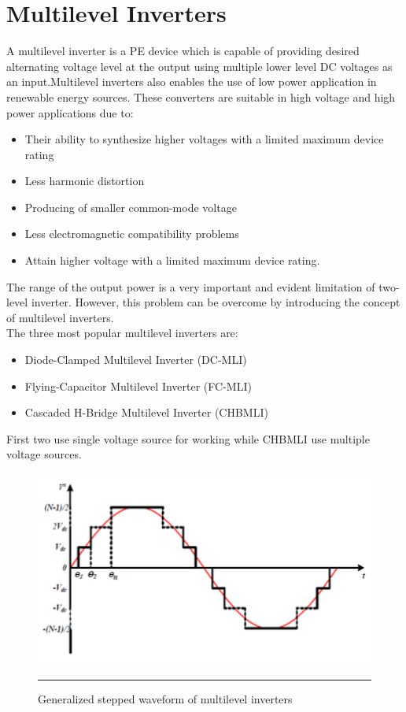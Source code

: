 \section{Multilevel Inverters}
A multilevel inverter is a PE device which is capable of providing desired alternating voltage level at the output using multiple lower level DC voltages as an input.Multilevel inverters also enables the use of low power application in renewable energy sources.
These converters are suitable in high voltage and high power
applications due to:
\begin{itemize}
\item Their ability to synthesize higher voltages with a
limited maximum device rating
\item Less harmonic distortion
\item Producing of smaller common-mode voltage
\item Less electromagnetic compatibility problems
\item Attain higher voltage with a limited maximum device rating.
\end{itemize}
The range of the output power is a very important and evident
limitation of two-level inverter. However, this problem can be
overcome by introducing the concept of multilevel inverters.\\
The three most popular multilevel inverters are:
\begin{itemize}
\item Diode-Clamped Multilevel Inverter (DC-MLI)
\item Flying-Capacitor Multilevel Inverter (FC-MLI)
\item Cascaded H-Bridge Multilevel Inverter (CHBMLI)
\end{itemize}
First two use single voltage source for working while CHBMLI use multiple voltage sources.
\begin{figure}[htbp]
	\centering
		\includegraphics[width = 5in]{./Figures/Picture3.pdf}
		\rule{35em}{5pt}
	\caption{Generalized stepped waveform of multilevel inverters }
	\label{fig:4}
\end{figure}
 
